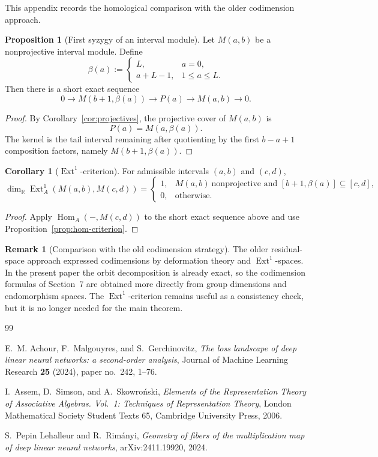 \documentclass[11pt]{article}
\newcommand{\Hom}{\operatorname{Hom}}
\newcommand{\Ext}{\operatorname{Ext}}
\newcommand{\R}{\mathbb{R}}
\theoremstyle{definition}
\newtheorem{proposition}[theorem]{Proposition}
\newtheorem{corollary}[theorem]{Corollary}
\newtheorem{remark}[theorem]{Remark}
\begin{document}
This appendix records the homological comparison with the older codimension
approach.

\begin{proposition}[First syzygy of an interval module]
Let \(M(a,b)\) be a nonprojective interval module. Define
\[
\beta(a):=
\begin{cases}
L, & a=0,\\
a+L-1, & 1\leq a\leq L.
\end{cases}
\]
Then there is a short exact sequence
\[
0\to M(b+1,\beta(a))\to P(a)\to M(a,b)\to 0.
\]
\end{proposition}

\begin{proof}
By Corollary~\ref{cor:projectives}, the projective cover of \(M(a,b)\) is
\[
P(a)=M(a,\beta(a)).
\]
The kernel is the tail interval remaining after quotienting by the first
\(b-a+1\) composition factors, namely \(M(b+1,\beta(a))\).
\end{proof}

\begin{corollary}[\(\Ext^1\)-criterion]
For admissible intervals \((a,b)\) and \((c,d)\),
\[
\dim_\R \Ext_A^1(M(a,b),M(c,d))
=
\begin{cases}
1, & M(a,b)\ \text{nonprojective and } [b+1,\beta(a)]\subseteq [c,d],\\
0, & \text{otherwise}.
\end{cases}
\]
\end{corollary}

\begin{proof}
Apply \(\Hom_A(-,M(c,d))\) to the short exact sequence above and use
Proposition~\ref{prop:hom-criterion}.
\end{proof}

\begin{remark}[Comparison with the old codimension strategy]
The older residual-space approach expressed codimensions by deformation theory
and \(\Ext^1\)-spaces. In the present paper the orbit decomposition is already
exact, so the codimension formulas of Section~7 are obtained more directly from
group dimensions and endomorphism spaces. The \(\Ext^1\)-criterion remains
useful as a consistency check, but it is no longer needed for the main theorem.
\end{remark}

\begin{thebibliography}{99}

E.~M. Achour, F.~Malgouyres, and S.~Gerchinovitz,
\emph{The loss landscape of deep linear neural networks: a second-order analysis},
Journal of Machine Learning Research \textbf{25} (2024), paper no.~242, 1--76.

I.~Assem, D.~Simson, and A.~Skowro\'nski,
\emph{Elements of the Representation Theory of Associative Algebras. Vol.~1:
Techniques of Representation Theory},
London Mathematical Society Student Texts 65, Cambridge University Press, 2006.

S.~Pepin Lehalleur and R.~Rim\'anyi,
\emph{Geometry of fibers of the multiplication map of deep linear neural networks},
arXiv:2411.19920, 2024.

\end{thebibliography}
\end{document}

